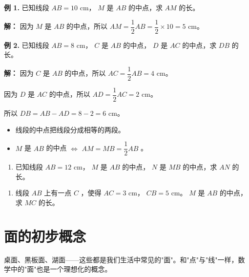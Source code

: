 \begin{workedexamples}


\textbf{例 1.} 已知线段 $AB = 10$ cm， $M$ 是 $AB$ 的中点，求 $AM$ 的长。

\textbf{解：} 因为 $M$ 是 $AB$ 的中点，所以 $AM = \dfrac{1}{2} AB = \dfrac{1}{2} \times 10 = 5$ cm。

\textbf{例 2.} 已知线段 $AB = 8$ cm， $C$ 是 $AB$ 的中点， $D$ 是 $AC$ 的中点，求 $DB$ 的长。

\textbf{解：}
因为 $C$ 是 $AB$ 的中点，所以 $AC = \dfrac{1}{2} AB = 4$ cm。

因为 $D$ 是 $AC$ 的中点，所以 $AD = \dfrac{1}{2} AC = 2$ cm。

所以 $DB = AB - AD = 8 - 2 = 6$ cm。

\end{workedexamples}

\begin{keytakeaway}


\begin{itemize}
  \item 线段的中点把线段分成相等的两段。
  \item $M$ 是 $AB$ 的中点 $\Longleftrightarrow$ $AM = MB = \dfrac{1}{2}AB$ 。
\end{itemize}


\end{keytakeaway}

\begin{practice}


\begin{enumerate}
  \item 已知线段 $AB = 12$ cm， $M$ 是 $AB$ 的中点， $N$ 是 $MB$ 的中点，求 $AN$ 的长。
\end{enumerate}


\begin{enumerate}
  \item 线段 $AB$ 上有一点 $C$ ，使得 $AC = 3$ cm， $CB = 5$ cm。 $M$ 是 $AB$ 的中点，求 $MC$ 的长。
\end{enumerate}


\end{practice}



\section*{面的初步概念}


\begin{explore}


桌面、黑板面、湖面——这些都是我们生活中常见的"面"。和"点"与"线"一样，数学中的"面"也是一个理想化的概念。

\end{explore}

